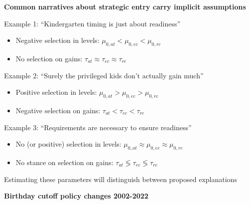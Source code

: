 \documentclass[t,aspectratio=169,11pt,presentation]{beamer}
\newenvironment{wideitemize}{\itemize\addtolength{\itemsep}{14pt}}{\enditemize}
\begin{document}
\begin{frame}[label=narratives]{\textbf{Common narratives about strategic entry carry implicit assumptions  }}
\begin{wideitemize}

\item Example 1: ``Kindergarten timing is just about readiness''
\begin{itemize}
    \item<2-> Negative selection in levels: $\mu_{0,at}<\mu_{0,ec}<\mu_{0,rc}$ 
    \item<3-> No selection on gains: $\tau_{at}\approx \tau_{ec} \approx \tau_{rc}$ 
\end{itemize}
    
\item<4-> Example 2: ``Surely the privileged kids don't actually gain much''
\begin{itemize}
    \item<5-> Positive selection in levels: $\mu_{0,at}>\mu_{0,ec}>\mu_{0,rc}$ 
    \item<6-> Negative selection on gains: $\tau_{at}<\tau_{ec} < \tau_{rc}$ 
\end{itemize}
    
\item<7-> Example 3: ``Requirements are necessary to ensure readiness''
\begin{itemize}
    \item<8-> No (or positive) selection in levels: $\mu_{0,at}\approx\mu_{0,ec}\approx \mu_{0,rc}$ 
    \item<9-> No stance on selection on gains: $\tau_{at}\lessgtr \tau_{ec} \lessgtr \tau_{rc}$ 
\end{itemize}
      
\item<10-> Estimating these parameters will distinguish between proposed explanations 
    

\end{wideitemize}

\hyperlink{wait3}{}  

\end{frame}




\begin{frame}[label=change]{\textbf{Birthday cutoff policy changes 2002-2022}}
\begin{scaletikzpicturetowidth}{.8\textwidth}

        \end{scaletikzpicturetowidth}
\vfill 

\hyperlink{policy1}{}   
\end{frame}
\end{document}
